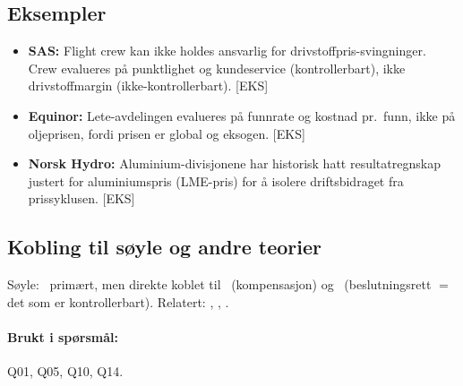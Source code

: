 \subsection*{Eksempler}
\begin{itemize}
\item \textbf{SAS:} Flight crew kan ikke holdes ansvarlig for drivstoffpris-svingninger. Crew evalueres på punktlighet og kundeservice (kontrollerbart), ikke drivstoffmargin (ikke-kontrollerbart). [EKS]
\item \textbf{Equinor:} Lete-avdelingen evalueres på funnrate og kostnad pr.\ funn, ikke på oljeprisen, fordi prisen er global og eksogen. [EKS]
\item \textbf{Norsk Hydro:} Aluminium-divisjonene har historisk hatt resultatregnskap justert for aluminiumspris (LME-pris) for å isolere driftsbidraget fra prissyklusen. [EKS]
\end{itemize}

\subsection*{Kobling til søyle og andre teorier}
Søyle: \STwo\ primært, men direkte koblet til \SThree\ (kompensasjon) og \SOne\ (beslutningsrett $=$ det som er kontrollerbart). Relatert: , , .

\paragraph{Brukt i spørsmål:} Q01, Q05, Q10, Q14.
